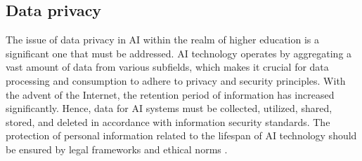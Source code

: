 \subsection{Data privacy}
The issue of data privacy in AI within the realm of higher education is a significant one that must be addressed. 
AI technology operates by aggregating a vast amount of data from various subfields, which makes it crucial for data
processing and consumption to adhere to privacy and security principles. With the advent of the Internet, the retention
period of information has increased significantly. Hence, data for AI systems must be collected, utilized, shared, stored, 
and deleted in accordance with information security standards. The protection of personal information related to the lifespan 
of AI technology should be ensured by legal frameworks and ethical norms \citep{unesco_2022}. 
